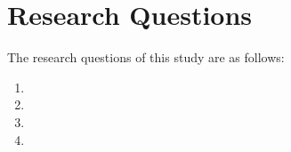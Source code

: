 \section*{ Research Questions}

The research questions of this study are as follows:
\begin{enumerate}

    \item 
    \item 
    \item 
    \item  
    
\end{enumerate}